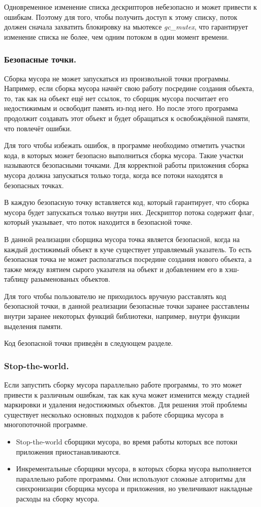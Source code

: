 Одновременное изменение списка дескрипторов небезопасно и может привести к ошибкам.
Поэтому для того, чтобы получить доступ к этому списку, поток должен сначала захватить блокировку на мьютексе \textit{gc\_mutex}, что гарантирует изменение списка не более, чем одним потоком в один момент времени.

\subsubsection{Безопасные точки.}
Сборка мусора не может запускаться из произвольной точки программы. Например, если сборка мусора начнёт свою работу посредине создания объекта, то, так как на объект ещё нет ссылок, то сборщик мусора
посчитает его недостижимым и освободит память из-под него. Но после этого программа продолжит создавать этот объект и будет обращаться к освобождённой памяти, что повлечёт ошибки.

Для того чтобы избежать ошибок, в программе необходимо отметить участки кода, в которых может безопасно выполниться сборка мусора. Такие участки называются  безопасными точками. Для корректной работы приложения сборка мусора должна запускаться только тогда, когда все потоки находятся в безопасных точках.

В каждую безопасную точку вставляется код, который гарантирует, что сборка мусора будет запускаться только внутри них. Дескриптор потока содержит флаг, который указывает, что поток находится в безопасной точке.

В данной реализации сборщика мусора точка является безопасной, когда на каждый достижимый объект в куче существует управляемый указатель. То есть безопасная точка не может располагаться посредине создания нового объекта, а также между взятием сырого указателя на объект и добавлением его в хэш-таблицу разыменованых объектов.

Для того чтобы пользователю не приходилось вручную расставлять код безопасной точки, в данной реализации безопасные точки заранее расставлены внутри заранее некоторых функций библиотеки, например, внутри функции выделения памяти.


Код безопасной точки приведён в следующем разделе.

\subsubsection{Stop-the-world.} \label{ch:stop-the-world}
Если запустить сборку мусора параллельно работе программы, то это может привести к различным ошибкам, так как куча может изменится между стадией маркировки и удаления недостижимых объектов. Для решения этой проблемы существует несколько основных подходов к работе сборщика мусора в многопоточной программе.
\begin{itemize}
\item Stop-the-world сборщики мусора, во время работы которых все потоки приложения приостанавливаются. 
\item Инкрементальные сборщики мусора, в которых сборка мусора выполняется параллельно работе программы. Они используют сложные алгоритмы для синхронизации сборщика мусора и приложения, но увеличивают накладные расходы на сборку мусора.
\end{itemize}

